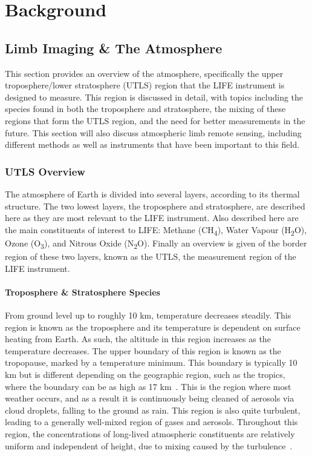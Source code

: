 \chapter{Background} \label{bkgnd}

\section{Limb Imaging \& The Atmosphere}
This section provides an overview of the atmosphere, specifically the upper troposphere/lower stratosphere (UTLS) region that the LIFE instrument is designed to measure. This region is discussed in detail, with topics including the species found in both the troposphere and stratosphere, the mixing of these regions that form the UTLS region, and the need for better measurements in the future. This section will also discuss atmospheric limb remote sensing, including different methods as well as instruments that have been important to this field.

\subsection{UTLS Overview}
The atmosphere of Earth is divided into several layers, according to its thermal structure. The two lowest layers, the troposphere and stratosphere, are described here as they are most relevant to the LIFE instrument. Also described here are the main constituents of interest to LIFE: Methane (CH\textsubscript{4}), Water Vapour (H\textsubscript{2}O), Ozone (O\textsubscript{3}), and Nitrous Oxide (N\textsubscript{2}O). Finally an overview is given of the border region of these two layers, known as the UTLS, the measurement region of the LIFE instrument.

\subsubsection{Troposphere \& Stratosphere Species}
From ground level up to roughly 10 km, temperature decreases steadily. This region is known as the troposphere and its temperature is dependent on surface heating from Earth. As such, the altitude in this region increases as the temperature decreases. The upper boundary of this region is known as the tropopause, marked by a temperature minimum. This boundary is typically 10 km but is different depending on the geographic region, such as the tropics, where the boundary can be as high as 17 km~\citep{ext_utls}. This is the region where most weather occurs, and as a result it is continuously being cleaned of aerosols via cloud droplets, falling to the ground as rain. This region is also quite turbulent, leading to a generally well-mixed region of gases and aerosols. Throughout this region, the concentrations of long-lived atmospheric constituents are relatively uniform and independent of height, due to mixing caused by the turbulence~\citep{atmos_phys_and_climate}.

